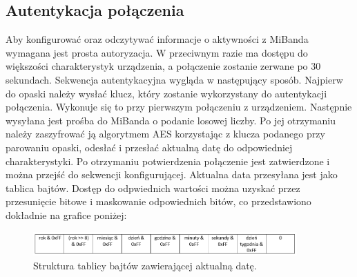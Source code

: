 \subsection{Autentykacja połączenia}
Aby konfigurować oraz odczytywać informacje o aktywności z MiBanda wymagana jest prosta autoryzacja. W przeciwnym razie ma dostępu do większości charakterystyk urządzenia, a połączenie zostanie zerwane po 30 sekundach. Sekwencja autentykacyjna wygląda w następujący sposób. Najpierw do opaski należy wysłać klucz, który zostanie wykorzystany do autentykacji połączenia. Wykonuje się to przy pierwszym połączeniu z urządzeniem. Następnie wysyłana jest prośba do MiBanda o podanie losowej liczby. Po jej otrzymaniu należy zaszyfrować ją algorytmem AES korzystając z klucza podanego przy parowaniu opaski, odesłać i przesłać aktualną datę do odpowiedniej charakterystyki. Po otrzymaniu potwierdzenia połączenie jest zatwierdzone i można przejść do sekwencji konfigurującej. Aktualna data przesyłana jest jako tablica bajtów. Dostęp do odpwiednich wartości można uzyskać przez przesunięcie bitowe i maskowanie odpowiednich bitów, co przedstawiono dokładnie na grafice poniżej:
\begin{figure}[H]
    \begin{center}
        \includegraphics[width=0.90\textwidth]{DateByteArray.png}
    \end{center}
    \caption{{\color{dgray}Struktura tablicy bajtów zawierającej aktualną datę.}} \label{dateByteArray}
\end{figure}

